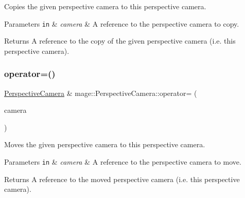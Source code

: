 Copies the given perspective camera to this perspective camera.


\begin{DoxyParams}[1]{Parameters}
\mbox{\tt in}  & {\em camera} & A reference to the perspective camera to copy. \\
\hline
\end{DoxyParams}
\begin{DoxyReturn}{Returns}
A reference to the copy of the given perspective camera (i.\+e. this perspective camera). 
\end{DoxyReturn}
\hypertarget{classmage_1_1_perspective_camera_a338c75900237f3623b31b0231a5f5782}{}\label{classmage_1_1_perspective_camera_a338c75900237f3623b31b0231a5f5782} 
\subsubsection{\texorpdfstring{operator=()}{operator=()}\hspace{0.1cm}{\footnotesize\ttfamily [2/2]}}
{\footnotesize\ttfamily \hyperlink{classmage_1_1_perspective_camera}{Perspective\+Camera} \& mage\+::\+Perspective\+Camera\+::operator= (\begin{DoxyParamCaption}\item[{\hyperlink{classmage_1_1_perspective_camera}{Perspective\+Camera} \&\&}]{camera }\end{DoxyParamCaption})\hspace{0.3cm}{\ttfamily [default]}}

Moves the given perspective camera to this perspective camera.


\begin{DoxyParams}[1]{Parameters}
\mbox{\tt in}  & {\em camera} & A reference to the perspective camera to move. \\
\hline
\end{DoxyParams}
\begin{DoxyReturn}{Returns}
A reference to the moved perspective camera (i.\+e. this perspective camera). 
\end{DoxyReturn}
\hypertarget{classmage_1_1_perspective_camera_af9357c3361ebec5764e19b23f9a13796}{}\label{classmage_1_1_perspective_camera_af9357c3361ebec5764e19b23f9a13796} 
